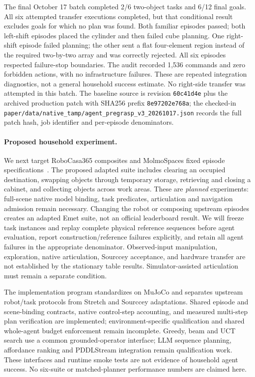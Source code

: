 The final October 17 batch completed 2/6 two-object tasks and 6/12 final goals.
All six attempted transfer executions completed, but that conditional result
excludes goals for which no plan was found. Both familiar episodes passed; both
left-shift episodes placed the cylinder and then failed cube planning. One
right-shift episode failed planning; the other sent a flat four-element region
instead of the required two-by-two array and was correctly rejected. All six
episodes respected failure-stop boundaries. The audit recorded 1,536 commands
and zero forbidden actions, with no infrastructure failures. These are repeated
integration diagnostics, not a general household success estimate. No right-side
transfer was attempted in this batch. The baseline source is revision
\texttt{60c41d4e} plus the archived production patch with SHA256 prefix
\texttt{8e97202e768a}; the checked-in
\texttt{paper/data/native\_tamp/agent\_pregrasp\_v3\_20261017.json}
records the full patch hash, job identifier and per-episode denominators.

\paragraph{Proposed household experiment.}
We next target RoboCasa365 composites and MolmoSpaces fixed episode
specifications~\citep{nasiriany2026robocasa365,robocasa365protocol2026,molmospaceseval2026}.
The proposed adapted suite includes clearing an occupied destination, swapping
objects through temporary storage, retrieving and closing a cabinet, and
collecting objects across work areas. These are \emph{planned} experiments:
full-scene native model binding, task predicates, articulation and navigation
admission remain necessary. Changing the robot or composing upstream episodes
creates an adapted Emet suite, not an official leaderboard result. We will
freeze task instances and replay complete physical reference sequences before
agent evaluation, report construction/reference failures explicitly, and retain
all agent failures in the appropriate denominator. Observed-input manipulation,
exploration, native articulation, Sourccey acceptance, and hardware transfer are
not established by the stationary table results. Simulator-assisted articulation
must remain a separate condition.

The implementation program standardizes on MuJoCo and separates upstream
robot/task protocols from Stretch and Sourccey adaptations. Shared episode and
scene-binding contracts, native control-step accounting, and measured multi-step
plan verification are implemented; environment-specific qualification and shared
whole-agent budget enforcement remain incomplete. Greedy, beam and UCT search use a
common grounded-operator interface; LLM sequence planning, affordance ranking
and PDDLStream integration remain qualification work. These interfaces and
runtime smoke tests are not evidence of household agent success. No six-suite
or matched-planner performance numbers are claimed here.

